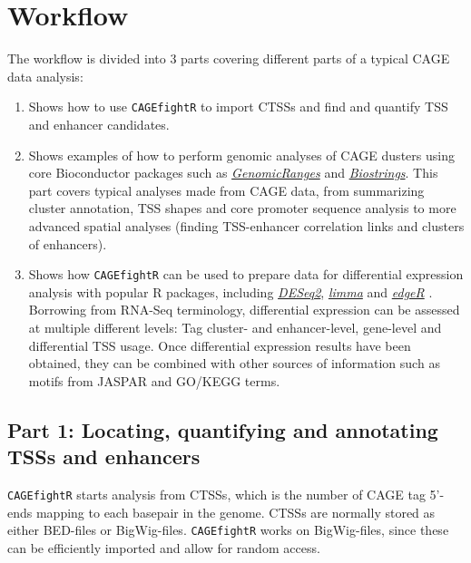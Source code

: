 \documentclass[9pt,a4paper,]{extarticle}
\begin{document}
\section{Workflow}\label{workflow}

The workflow is divided into 3 parts covering different parts of a typical CAGE data analysis:

\begin{enumerate}
\def\labelenumi{\arabic{enumi}.}
\item
  Shows how to use \texttt{CAGEfightR} to import CTSSs and find and quantify TSS and enhancer candidates.
\item
  Shows examples of how to perform genomic analyses of CAGE dusters using core Bioconductor packages such as \emph{\href{https://bioconductor.org/packages/3.8/GenomicRanges}{GenomicRanges}} and \emph{\href{https://bioconductor.org/packages/3.8/Biostrings}{Biostrings}}. This part covers typical analyses made from CAGE data, from summarizing cluster annotation, TSS shapes and core promoter sequence analysis to more advanced spatial analyses (finding TSS-enhancer correlation links and clusters of enhancers).
\item
  Shows how \texttt{CAGEfightR} can be used to prepare data for differential expression analysis with popular R packages, including \emph{\href{https://bioconductor.org/packages/3.8/DESeq2}{DESeq2}}, \emph{\href{https://bioconductor.org/packages/3.8/limma}{limma}} and \emph{\href{https://bioconductor.org/packages/3.8/edgeR}{edgeR}} \citep{Love2014, Ritchie2015a, Robinson2010}. Borrowing from RNA-Seq terminology, differential expression can be assessed at multiple different levels: Tag cluster- and enhancer-level, gene-level and differential TSS usage\citep{Soneson2016}. Once differential expression results have been obtained, they can be combined with other sources of information such as motifs from JASPAR \citep{Mathelier2016} and GO/KEGG terms\citep[Hancock2014; Gene2019;][]{Qi2016}.
\end{enumerate}

\subsection{Part 1: Locating, quantifying and annotating TSSs and enhancers}\label{part-1-locating-quantifying-and-annotating-tsss-and-enhancers}

\texttt{CAGEfightR} starts analysis from CTSSs, which is the number of CAGE tag 5'-ends mapping to each basepair in the genome. CTSSs are normally stored as either BED-files or BigWig-files. \texttt{CAGEfightR} works on BigWig-files, since these can be efficiently imported and allow for random access.
\end{document}
